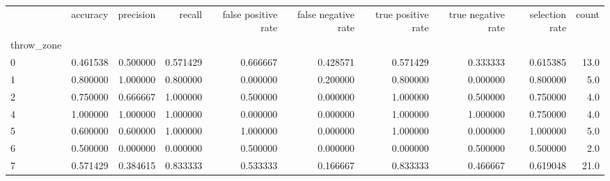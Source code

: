 \begin{tabular}{lrrrrrrrrr}
\toprule
{} &  accuracy &  precision &    recall &  false positive rate &  false negative rate &  true positive rate &  true negative rate &  selection rate &  count \\
throw\_zone &           &            &           &                      &                      &                     &                     &                 &        \\
\midrule
0          &  0.461538 &   0.500000 &  0.571429 &             0.666667 &             0.428571 &            0.571429 &            0.333333 &        0.615385 &   13.0 \\
1          &  0.800000 &   1.000000 &  0.800000 &             0.000000 &             0.200000 &            0.800000 &            0.000000 &        0.800000 &    5.0 \\
2          &  0.750000 &   0.666667 &  1.000000 &             0.500000 &             0.000000 &            1.000000 &            0.500000 &        0.750000 &    4.0 \\
4          &  1.000000 &   1.000000 &  1.000000 &             0.000000 &             0.000000 &            1.000000 &            1.000000 &        0.750000 &    4.0 \\
5          &  0.600000 &   0.600000 &  1.000000 &             1.000000 &             0.000000 &            1.000000 &            0.000000 &        1.000000 &    5.0 \\
6          &  0.500000 &   0.000000 &  0.000000 &             0.500000 &             0.000000 &            0.000000 &            0.500000 &        0.500000 &    2.0 \\
7          &  0.571429 &   0.384615 &  0.833333 &             0.533333 &             0.166667 &            0.833333 &            0.466667 &        0.619048 &   21.0 \\
\bottomrule
\end{tabular}
